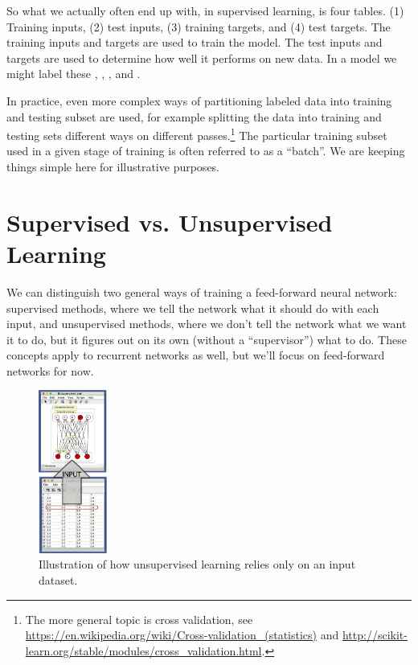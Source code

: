 So what we actually often end up with, in supervised learning, is four tables. (1) Training inputs, (2) test inputs, (3) training targets, and (4) test targets. The training inputs and targets are used to train the model. The test inputs and targets are used to determine how well it performs on new data. In a model we might label these , , , and . 

In practice, even more complex ways of partitioning labeled data into training and testing subset are used, for example splitting the data into training and testing sets different ways on different passes.\footnote{The more general topic is cross validation, see \url{https://en.wikipedia.org/wiki/Cross-validation_(statistics)} and \url{http://scikit-learn.org/stable/modules/cross_validation.html}.} The particular training subset used in a given stage of training is often referred to as a ``batch''. We are keeping things simple here for illustrative purposes.
 

\section{Supervised vs. Unsupervised Learning}


We can distinguish two general ways of training a feed-forward neural network: supervised methods, where we tell the network what it should do with each input, and unsupervised methods, where we don't tell the network what we want it to do, but it figures out on its own (without a ``supervisor'') what to do. These concepts apply to recurrent networks as well, but we'll focus on feed-forward networks for now.

\begin{figure}[h]
\centering
\includegraphics[width=0.2\textwidth]{./images/dataset_unsupervised.png}
\caption[Simbrain screenshot with graphical elements added by Pamela Payne.]{Illustration of how unsupervised learning relies only on an input dataset.}
\label{unsupervised_learning}
\end{figure}

